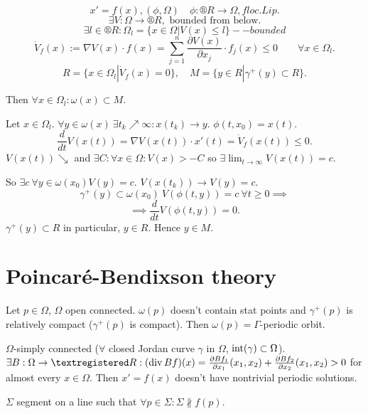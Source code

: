 \documentclass[12pt]{article}					%
\begin{document}
\begin{veta}
	$$ x' = f(x), (\phi, \Omega) \quad \phi: ®R \rightarrow \Omega, f loc. Lip. $$
	$$ \exists V: \Omega \rightarrow ®R, \text{ bounded from below}. $$
	$$ \exists l \in ®R: \Omega_l = \{x \in \Omega | V(x) ≤ l\} -- bounded $$
	$$ \dot{V}_f(x) := \nabla V(x) · f(x) = \sum_{j=1}^n  \frac{\partial V(x)}{\partial x_j}·f_j(x) ≤ 0 \qquad \forall x \in \Omega_l. $$
	$$ R = \{x \in \Omega_l | \dot{V}_f(x) = 0\}, \quad M = \{y \in R | \gamma^+(y) \subset R\}. $$

	Then $\forall x \in \Omega_l: \omega(x) \subset M$.

	\begin{dukazin}
		Let $x \in \Omega_l$. $\forall y \in \omega(x)\ \exists t_k \nearrow ∞: x(t_k) \rightarrow y$. $\phi(t, x_0) = x(t)$.
		$$ \frac{d}{dt} V(x(t)) = \nabla V(x(t))·x'(t) = \dot{V}_f(x(t)) ≤ 0. $$
		$V(x(t)) \searrow$ and $\exists C: \forall x \in \Omega: V(x) > -C$ so $\exists \lim_{t \rightarrow ∞} V(x(t)) = c$.

		So $\exists c\ \forall y \in \omega(x_0) V(y) = c$. $V(x(t_k)) \rightarrow V(y) = c$.
		$$ \gamma^+(y) \subset \omega(x_0)\ V(\phi(t, y)) = c\ \forall t ≥ 0 \implies $$
		$$ \implies \frac{d}{dt}V(\phi(t, y)) = 0. $$
		$\gamma^+(y) \subset R$ in particular, $y \in R$. Hence $y \in M$.
	\end{dukazin}
\end{veta}

\section{Poincaré-Bendixson theory}
\begin{veta}
	Let $p \in \Omega$, $\Omega$ open connected. $\omega(p)$ doesn't contain stat points and $\gamma^+(p)$ is relatively compact ($\gamma^+(p)$ is compact). Then $\omega(p) = \Gamma$-periodic orbit.
\end{veta}

\begin{veta}
	$\Omega$-simply connected ($\forall$ closed Jordan curve $\gamma$ in $\Omega$, $\operatorname{int}(\gamma) \subset \Omega$). $\exists B: \Omega \rightarrow ®R: (\Div Bf)(x) = \frac{\partial Bf_1}{\partial x_1}(x_1, x_2) + \frac{\partial Bf_2}{\partial x_2}(x_1, x_2) > 0$ for almost every $x \in \Omega$. Then $x' = f(x)$ doesn't have nontrivial periodic solutions.
\end{veta}

\begin{definice}[Transverzála]
	$\Sigma$ segment on a line such that $\forall p \in \Sigma: \Sigma \not\parallel f(p)$.
\end{definice}
\end{document}
